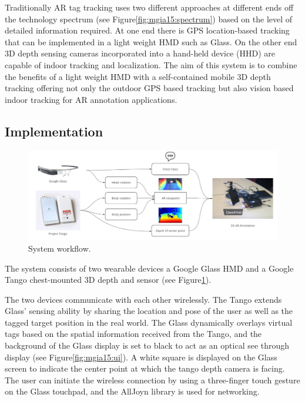 Traditionally AR tag tracking uses two different approaches at different  ends off the technology spectrum (see Figure\ref{fig:mgia15:spectrum}) based on the level of detailed information required. At one end there is GPS location-based tracking that can be implemented in a light weight HMD such as Glass. On the other end 3D depth sensing cameras incorporated into a hand-held device (HHD) are capable of indoor tracking and localization. The aim of this system is to combine the benefits of a light weight HMD with a self-contained mobile 3D depth tracking offering not only the outdoor GPS based tracking but also vision based indoor tracking  for AR annotation applications. 

\subsection{Implementation}

\begin{figure}
  \centering
  \includegraphics[width=\linewidth]{images/mgia15/mgia2015-system.jpg}
  \caption{System workflow.}
  \label{framework}
\end{figure}

The system consists of two wearable devices a Google Glass HMD and a Google Tango chest-mounted 3D depth and sensor (see Figure\ref{framework}).

The two devices communicate with each other wirelessly. The Tango extends Glass' sensing ability by sharing the location and pose of the user as well as the tagged target position in the real world. The Glass dynamically overlays virtual tags based on the spatial information received from the Tango, and the background of the Glass display is set to black to act as an optical see through display (see Figure\ref{fig:mgia15:ui}). A white square is displayed on the Glass screen to indicate the center point at which the tango depth camera is facing. The user can initiate the wireless connection by using a three-finger touch gesture on the Glass touchpad, and the AllJoyn library  is used for networking.

